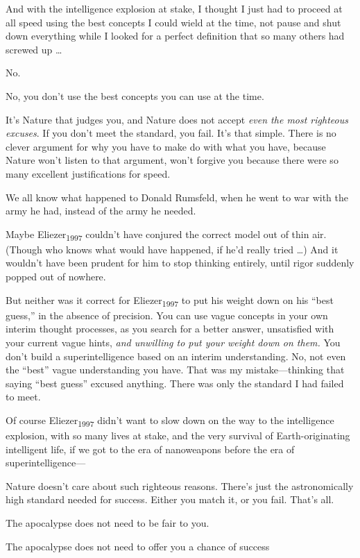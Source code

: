 {
 And with the intelligence explosion at stake, I thought I just had
to proceed at all speed using the best concepts I could wield at the
time, not pause and shut down everything while I looked for a perfect
definition that so many others had screwed up \ldots}

{
 No.}

{
 No, you don't use the best concepts you can use at
the time.}

{
 It's Nature that judges you, and Nature does not
accept \textit{even the most righteous excuses}. If you
don't meet the standard, you fail. It's
that simple. There is no clever argument for why you have to make do
with what you have, because Nature won't listen to that
argument, won't forgive you because there were so many
excellent justifications for speed.}

{
 We all know what happened to Donald Rumsfeld, when he went to war
with the army he had, instead of the army he needed.}

{
 Maybe Eliezer\textsubscript{1997} couldn't have
conjured the correct model out of thin air. (Though who knows what
would have happened, if he'd really tried \ldots) And it
wouldn't have been prudent for him to stop thinking
entirely, until rigor suddenly popped out of nowhere.}

{
 But neither was it correct for Eliezer\textsubscript{1997} to put
his weight down on his ``best
guess,'' in the absence of precision. You can use
vague concepts in your own interim thought processes, as you search for
a better answer, unsatisfied with your current vague hints, \textit{and
unwilling to put your weight down on them.} You don't
build a superintelligence based on an interim understanding. No, not
even the ``best'' vague
understanding you have. That was my mistake---thinking that saying
``best guess'' excused anything.
There was only the standard I had failed to meet.}

{
 Of course Eliezer\textsubscript{1997} didn't want
to slow down on the way to the intelligence explosion, with so many
lives at stake, and the very survival of Earth-originating intelligent
life, if we got to the era of nanoweapons before the era of
superintelligence---}

{
 Nature doesn't care about such righteous reasons.
There's just the astronomically high standard needed
for success. Either you match it, or you fail. That's
all.}

{
 The apocalypse does not need to be fair to you.}

{
 The apocalypse does not need to offer you a chance of success}

